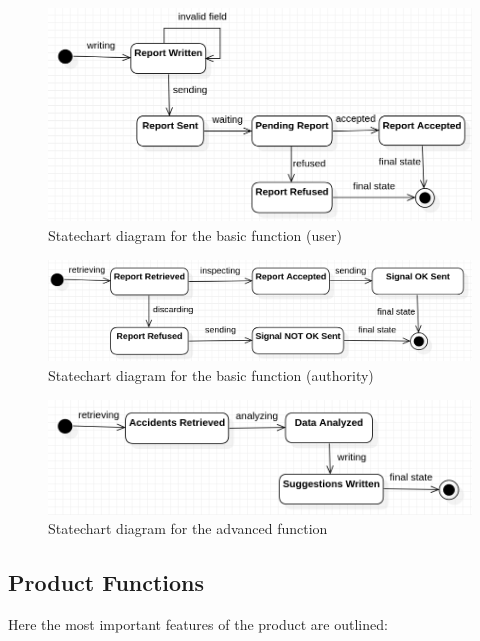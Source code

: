 \begin{figure} [H]
    \centering
    \includegraphics[width=\textwidth]{Images/Diagrams/State-1.png}
    \caption{\label{fig:State-1}Statechart diagram for the basic function (user)}
\end{figure}

\begin{figure} [H]
    \centering
    \includegraphics[width=\textwidth]{Images/Diagrams/State-2.png}
    \caption{\label{fig:State-2}Statechart diagram for the basic function (authority)}
\end{figure}

\begin{figure} [H]
    \includegraphics[width=\textwidth]{Images/Diagrams/State-3.png}
    \caption{\label{fig:State-3}Statechart diagram for the advanced function}
\end{figure}

\subsection{Product Functions}

Here the most important features of the product are outlined:

